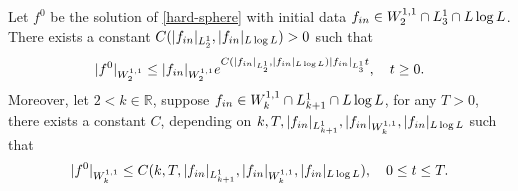 \documentclass[10pt,a4paper]{amsart}
\newcommand{\beno}{\begin{eqnarray*}}
\newcommand{\ben}{\begin{eqnarray}}
\newcommand{\eeno}{\end{eqnarray*}}
\newcommand{\een}{\end{eqnarray}}
\begin{document}
\begin{lem}\label{lemma3.3}
Let $f^0$ be the solution of \eqref{hard-sphere} with initial data $f_{\textup{in}}\in W^{1,1}_2\cap L^1_{3}\cap L\log L$. 
    There exists  a constant $C(|f_{\textup{in}}|_{L^1_2},|f_{\textup{in}}|_{L\log L})>0$ such that
    \ben\label{3.3}
|f^0|_{W^{1,1}_2}\le |f_{\textup{in}}|_{W^{1,1}_2}e^{C(|f_{\textup{in}}|_{L^1_2},|f_{\textup{in}}|_{L\log L})|f_{\textup{in}}|_{L^1_3} t},\quad t\ge0.
    \een
    Moreover, let $2< k\in\mathbb{R}$, suppose $f_{\textup{in}}\in W^{1,1}_{k}\cap L^1_{k+1}\cap L\log L$,
    for any $T>0$, there exists a constant $C$, depending on $k,T,|f_{\textup{in}}|_{L^1_{k+1}},|f_{\textup{in}}|_{W^{1,1}_{k}},|f_{\textup{in}}|_{L\log L}$ such that
    \beno
|f^0|_{W^{1,1}_{k}}\le C(k,T,|f_{\textup{in}}|_{L^1_{k+1}},|f_{\textup{in}}|_{W^{1,1}_{k}},|f_{\textup{in}}|_{L\log L}),\quad 0\le t\le T.
    \eeno
\end{lem}
\end{document}
